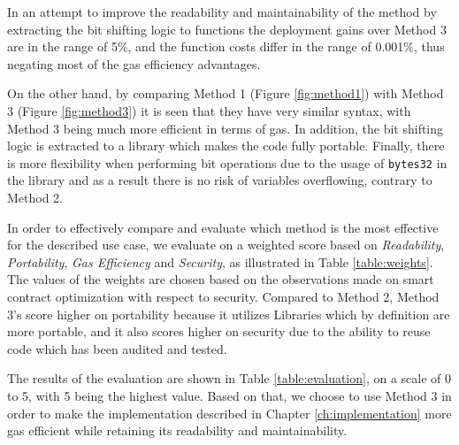 In an attempt to improve the readability and maintainability of the method by extracting the bit shifting logic to functions the deployment gains over Method 3 are in the range of 5\%, and the function costs differ in the range of 0.001\%, thus negating most of the gas efficiency advantages.


On the other hand, by comparing Method 1 (Figure \ref{fig:method1}) with Method 3 (Figure \ref{fig:method3}) it is seen that they have very similar syntax, with Method 3 being much more efficient in terms of gas. In addition, the bit shifting logic is extracted to a library which makes the code fully portable. Finally, there is more flexibility when performing bit operations due to the usage of \texttt{bytes32} in the library and as a result there is no risk of variables overflowing, contrary to Method 2.



In order to effectively compare and evaluate which method is the most effective for the described use case, we evaluate on a weighted score based on \textit{Readability}, \textit{Portability}, \textit{Gas Efficiency} and \textit{Security}, as illustrated in Table \ref{table:weights}. The values of the weights are chosen based on the observations made on smart contract optimization with respect to security. Compared to Method 2, Method 3's score higher on portability because it utilizes Libraries which by definition are more portable, and it also scores higher on security due to the ability to reuse code which has been audited and tested.



The results of the evaluation are shown in Table \ref{table:evaluation}, on a scale of 0 to 5, with 5 being the highest value. Based on that, we choose to use Method 3 in order to make the implementation described in Chapter \ref{ch:implementation} more gas efficient while retaining its readability and maintainability. 





